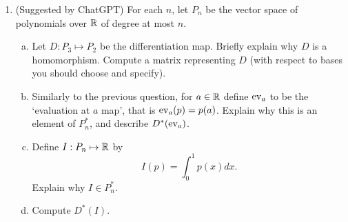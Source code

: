 \documentclass[12pt]{article}
\begin{document}
\begin{enumerate}
\begin{enumerate}[(a)]
\end{enumerate}

\item (Suggested by ChatGPT)
For each $n$, let $P_n$ be the vector space of polynomials over $\mathbb{R}$ of degree at most $n$.
\begin{enumerate}[(a)]
\item 
Let $D : P_3 \mapsto P_2$ be the differentiation map. Briefly explain why $D$ is a homomorphism. Compute a matrix representing $D$
(with respect to bases you should choose and specify).
\item 
Similarly to the previous question, for $a \in \mathbb{R}$ define $\textnormal{ev}_a$ to be the `evaluation at $a$ map', that is 
$\textnormal{ev}_a(p) = p(a)$. Explain why this is an element of $P_n^*$, and describe $D^*(\textnormal{ev}_a)$.
\item 
Define $I : P_n \mapsto \mathbb{R}$ by
\[
I(p) = \int_0^1 p(x) dx.
\]
Explain why $I \in P_n^*$. 
\item
Compute $D^*(I)$.
\end{enumerate}

\end{enumerate}
\end{document}
